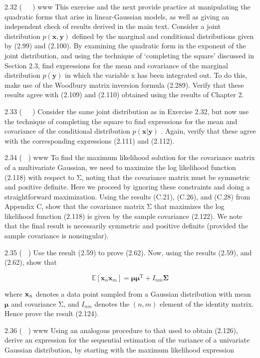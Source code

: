\documentclass[
  10
]{article}
\begin{document}
2.32 (  ) www This exercise and the next provide practice at
manipulating the quadratic forms that arise in linear-Gaussian models,
as well as giving an independent check of results derived in the main
text. Consider a joint distribution
\(p ( \mathbf { x } , \mathbf { y } )\) defined by the marginal and
conditional distributions given by (2.99) and (2.100). By examining the
quadratic form in the exponent of the joint distribution, and using the
technique of `completing the square' discussed in Section 2.3, find
expressions for the mean and covariance of the marginal distribution
\(p ( \mathbf { y } )\) in which the variable x has been integrated out.
To do this, make use of the Woodbury matrix inversion formula (2.289).
Verify that these results agree with (2.109) and (2.110) obtained using
the results of Chapter 2.

2.33 (  ) Consider the same joint distribution as in Exercise 2.32, but
now use the technique of completing the square to find expressions for
the mean and covariance of the conditional distribution
\(p ( \mathbf { x } | \mathbf { y } )\) . Again, verify that these agree
with the corresponding expressions (2.111) and (2.112).

2.34 ( ) www To find the maximum likelihood solution for the covariance
matrix of a multivariate Gaussian, we need to maximize the log
likelihood function (2.118) with respect to Σ, noting that the
covariance matrix must be symmetric and positive definite. Here we
proceed by ignoring these constraints and doing a straightforward
maximization. Using the results (C.21), (C.26), and (C.28) from Appendix
C, show that the covariance matrix Σ that maximizes the log likelihood
function (2.118) is given by the sample covariance (2.122). We note that
the final result is necessarily symmetric and positive definite
(provided the sample covariance is nonsingular).

2.35 ( ) Use the result (2.59) to prove (2.62). Now, using the results
(2.59), and (2.62), show that

\[
\mathbb {E} [ \mathbf {x} _ {n} \mathbf {x} _ {m} ] = \pmb {\mu} \pmb {\mu} ^ {\mathrm{T}} + I _ {n m} \pmb {\Sigma}\tag{2.291}
\]

where \({ \bf x } _ { n }\) denotes a data point sampled from a Gaussian
distribution with mean \(\pmb { \mu }\) and covariance Σ, and
\(I _ { n m }\) denotes the \(( n , m )\) element of the identity
matrix. Hence prove the result (2.124).

2.36 ( ) www Using an analogous procedure to that used to obtain
(2.126), derive an expression for the sequential estimation of the
variance of a univariate Gaussian distribution, by starting with the
maximum likelihood expression
\end{document}
